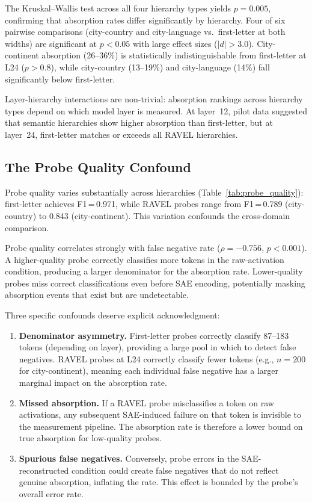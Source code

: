 \documentclass{article}
\begin{document}
The Kruskal--Wallis test across all four hierarchy types yields $p = 0.005$, confirming that absorption rates differ significantly by hierarchy. Four of six pairwise comparisons (city-country and city-language vs.\ first-letter at both widths) are significant at $p < 0.05$ with large effect sizes ($|d| > 3.0$). City-continent absorption (26--36\%) is statistically indistinguishable from first-letter at L24 ($p > 0.8$), while city-country (13--19\%) and city-language (14\%) fall significantly below first-letter.

Layer-hierarchy interactions are non-trivial: absorption rankings across hierarchy types depend on which model layer is measured. At layer~12, pilot data suggested that semantic hierarchies show higher absorption than first-letter, but at layer~24, first-letter matches or exceeds all RAVEL hierarchies.

\subsection{The Probe Quality Confound}
\label{sec:confound}

Probe quality varies substantially across hierarchies (Table~\ref{tab:probe_quality}): first-letter achieves F1\,=\,0.971, while RAVEL probes range from F1\,=\,0.789 (city-country) to 0.843 (city-continent). This variation confounds the cross-domain comparison.

Probe quality correlates strongly with false negative rate ($\rho = -0.756$, $p < 0.001$). A higher-quality probe correctly classifies more tokens in the raw-activation condition, producing a larger denominator for the absorption rate. Lower-quality probes miss correct classifications even before SAE encoding, potentially masking absorption events that exist but are undetectable.

Three specific confounds deserve explicit acknowledgment:

\begin{enumerate}
\item \textbf{Denominator asymmetry.} First-letter probes correctly classify 87--183 tokens (depending on layer), providing a large pool in which to detect false negatives. RAVEL probes at L24 correctly classify fewer tokens (e.g., $n = 200$ for city-continent), meaning each individual false negative has a larger marginal impact on the absorption rate.

\item \textbf{Missed absorption.} If a RAVEL probe misclassifies a token on raw activations, any subsequent SAE-induced failure on that token is invisible to the measurement pipeline. The absorption rate is therefore a lower bound on true absorption for low-quality probes.

\item \textbf{Spurious false negatives.} Conversely, probe errors in the SAE-reconstructed condition could create false negatives that do not reflect genuine absorption, inflating the rate. This effect is bounded by the probe's overall error rate.
\end{enumerate}
\end{document}
